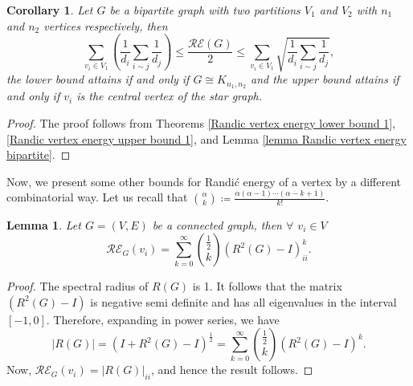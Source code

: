 \documentclass[10 pt]{article}
\newtheorem{lemma}{Lemma}[section]
\newtheorem{corollary}{Corollary}[section]
\numberwithin{equation}{section}
\begin{document}
\begin{corollary}
Let $G$ be a bipartite graph with two partitions $V_1$ and $V_2$ with $n_1$ and $n_2$ vertices respectively, then
$$\sum\limits_{v_i\in V_1}\left(\frac{1}{d_i}\sum\limits_{i\sim j}\frac{1}{d_j}\right)\leq \frac{\mathcal{RE}(G)}{2}\leq \sum\limits_{v_i\in V_1}\sqrt{\frac{1}{d_i}\sum\limits_{i\sim j}\frac{1}{d_j}},$$
the lower bound attains if and only if $G\cong K_{n_1,n_2}$ and the upper bound attains if and only if $v_i$ is the central vertex of the star graph.
\end{corollary}
\begin{proof}
The proof follows from Theorems \ref{Randic vertex energy lower bound 1}, \ref{Randic vertex energy upper bound 1}, and Lemma \ref{lemma Randic vertex energy bipartite}.
\end{proof}




Now, we present some other bounds for Randi\'c energy of a vertex by a different combinatorial way. Let us recall that $\binom{\alpha}{k}\coloneqq\frac{\alpha(\alpha -1)\cdots(\alpha-k+1)}{k!}$.

\begin{lemma}
Let $G=(V,E)$ be a connected graph, then $\forall$ $v_i\in V$
$$\mathcal{RE}_G(v_i)=\sum\limits_{k=0}^\infty \binom{\frac{1}{2}}{k}\left(R^2(G)-I\right)^k_{ii}.$$
\end{lemma}
\begin{proof}
The spectral radius of $R(G)$ is 1. It follows that the matrix $\left(R^2(G)-I\right)$ is negative semi definite and has all eigenvalues in the interval $[-1,0]$. Therefore, expanding in power series, we have
$$|R(G)|=\left(I+R^2(G)-I\right)^{\frac{1}{2}}=\sum\limits_{k=0}^\infty \binom{\frac{1}{2}}{k}\left(R^2(G)-I\right)^k.$$
Now, $\mathcal{RE}_G(v_i)=|R(G)|_{ii}$, and hence the result follows.
\end{proof}
\end{document}
